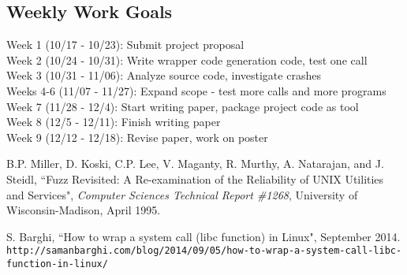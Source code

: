 \documentclass[10pt]{article}
\begin{document}
\subsection{Weekly Work Goals}
\noindent Week 1 (10/17 - 10/23): Submit project proposal\\
Week 2 (10/24 - 10/31): Write wrapper code generation code, test one call\\
Week 3 (10/31 - 11/06): Analyze source code, investigate crashes\\
Weeks 4-6 (11/07 - 11/27): Expand scope - test more calls and more programs\\
Week 7 (11/28 - 12/4): Start writing paper, package project code as tool\\
Week 8 (12/5 - 12/11): Finish writing paper\\
Week 9 (12/12 - 12/18): Revise paper, work on poster\\

\begin{thebibliography}{9}
	B.P. Miller, D. Koski, C.P. Lee, V. Maganty, R. Murthy, A. Natarajan, and J. Steidl, ``Fuzz Revisited: A Re-examination of the Reliability of UNIX Utilities and Services", \textit{Computer Sciences Technical Report \#1268}, University of Wisconsin-Madison, April 1995.
	
	S. Barghi, ``How to wrap a system call (libc function) in Linux", September 2014.\\
	\texttt{http://samanbarghi.com/blog/2014/09/05/how-to-wrap-a-system-call-libc-function-in-linux/}
\end{thebibliography}
\end{document}
